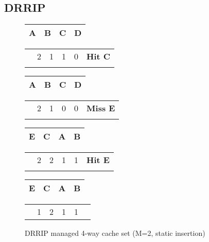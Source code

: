 \subsection{DRRIP}
\label{sec:background:algorithms:drrip}

\begin{figure}[ht]
    \centering
    \begin{tabular}{|p{2cm}|p{2cm}|p{2cm}|p{2cm}|}
        \hline
        A & B & C & D \\
        \hline
    \end{tabular}
    \begin{tabular}{p{2cm}p{2cm}p{2cm}p{2cm}p{2cm}p{2cm}}
        & 2 & 1 & 1 & 0 & \bf{Hit C} \\
        &   &   &   &   &
    \end{tabular}    

    \begin{tabular}{|p{2cm}|p{2cm}|p{2cm}|p{2cm}|}
        \hline
        A & B & C & D \\
        \hline
    \end{tabular}
    \begin{tabular}{p{2cm}p{2cm}p{2cm}p{2cm}p{2cm}p{2cm}}
        & 2 & 1 & 0 & 0 & \bf{Miss E} \\
        &   &   &   &   &
    \end{tabular}     

    \begin{tabular}{|p{2cm}|p{2cm}|p{2cm}|p{2cm}|}
        \hline
        E & C & A & B \\
        \hline
    \end{tabular}
    \begin{tabular}{p{2cm}p{2cm}p{2cm}p{2cm}p{2cm}p{2cm}}
        & 2 & 2 & 1 & 1 & \bf{Hit E} \\
        &   &   &   &   &
    \end{tabular}    

    \begin{tabular}{|p{2cm}|p{2cm}|p{2cm}|p{2cm}|}
        \hline
        E & C & A & B \\
        \hline
    \end{tabular}
    \begin{tabular}{p{2cm}p{2cm}p{2cm}p{2cm}p{2cm}p{2cm}}
        & 1 & 2 & 1 & 1 & 
    \end{tabular} 

    \caption{DRRIP managed 4-way cache set (M=2, static insertion)}
    \label{fig:background:drrip_example}
\end{figure}

